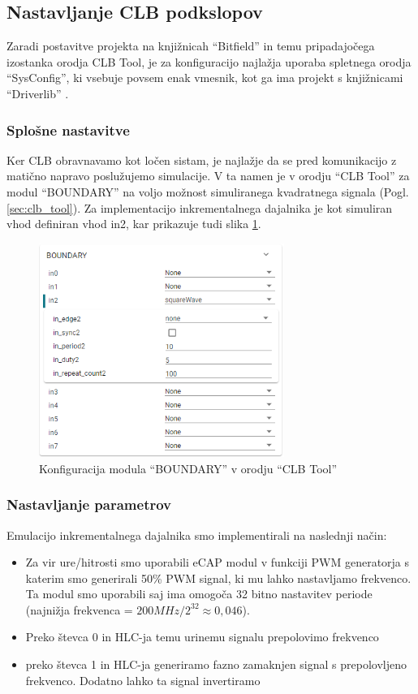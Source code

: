 \documentclass[a4paper]{article}
\begin{document}
\subsection{Nastavljanje CLB podkslopov}\label{sec:nastavitve_podsklopov}
Zaradi postavitve projekta na knjižnicah ``Bitfield'' in temu pripadajočega izostanka orodja CLB Tool, je za konfiguracijo najlažja uporaba spletnega orodja ``SysConfig'', ki vsebuje povsem enak vmesnik, kot ga ima projekt s knjižnicami ``Driverlib'' \cite{sysconfig}.

\subsubsection{Splošne nastavitve}
Ker CLB obravnavamo kot ločen sistam, je najlažje da se pred komunikacijo z matično napravo poslužujemo simulacije. V ta namen je v orodju ``CLB Tool'' za modul ``BOUNDARY'' na voljo možnost simuliranega kvadratnega signala (Pogl. \ref{sec:clb_tool}). Za implementacijo inkrementalnega dajalnika je kot simuliran vhod definiran vhod in2, kar prikazuje tudi slika \ref{fig:clbtool_boundary}.

\begin{figure}[htb]
    \centerline{\includegraphics[width=8cm]{clbtool_boundary}}
    \caption{Konfiguracija modula ``BOUNDARY'' v orodju ``CLB Tool''}
    \label{fig:clbtool_boundary} 
\end{figure} 

\subsubsection{Nastavljanje parametrov}\label{sec:nastavljanje_clb}
Emulacijo inkrementalnega dajalnika smo implementirali na naslednji način:
\begin{itemize}
    \item Za vir ure/hitrosti smo uporabili eCAP modul v funkciji PWM generatorja s katerim smo generirali 50\% PWM signal, ki mu lahko nastavljamo frekvenco. Ta modul smo uporabili saj ima omogoča 32 bitno nastavitev periode (najnižja frekvenca = $200MHz/2^{32} \approx 0,046$).
    \item Preko števca 0 in HLC-ja temu urinemu signalu prepolovimo frekvenco
    \item preko števca 1 in HLC-ja generiramo fazno zamaknjen signal s prepolovljeno frekvenco. Dodatno lahko ta signal invertiramo
\end{itemize}
\end{document}
